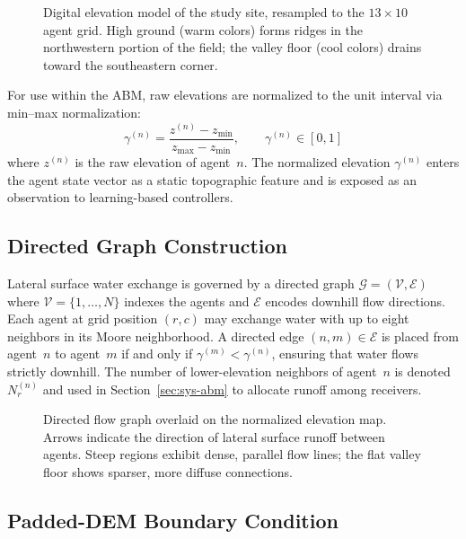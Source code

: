 \begin{figure}[h]
\centering
\caption{Digital elevation model of the study site, resampled to the
$13 \times 10$ agent grid. High ground (warm colors) forms ridges in the
northwestern portion of the field; the valley floor (cool colors) drains
toward the southeastern corner.}
\label{fig:dem-heatmap}
\end{figure}

For use within the ABM, raw elevations are normalized to the unit interval
via min--max normalization:
\begin{equation}
\gamma^{(n)} = \frac{z^{(n)} - z_{\min}}{z_{\max} - z_{\min}}, \qquad
\gamma^{(n)} \in [0,1]
\label{eq:elev-norm}
\end{equation}
where $z^{(n)}$ is the raw elevation of agent~$n$. The normalized
elevation $\gamma^{(n)}$ enters the agent state vector as a static
topographic feature and is exposed as an observation to learning-based
controllers.

\subsection{Directed Graph Construction}
\label{ssec:sys-graph}

Lateral surface water exchange is governed by a directed graph
$\mathcal{G} = (\mathcal{V}, \mathcal{E})$ where
$\mathcal{V} = \{1, \ldots, N\}$ indexes the agents and
$\mathcal{E}$ encodes downhill flow directions. Each agent at grid
position $(r, c)$ may exchange water with up to eight neighbors in its
Moore neighborhood. A directed edge $(n, m) \in \mathcal{E}$ is placed
from agent~$n$ to agent~$m$ if and only if
$\gamma^{(m)} < \gamma^{(n)}$, ensuring that water flows strictly
downhill. The number of lower-elevation neighbors of agent~$n$ is
denoted $N_r^{(n)}$ and used in Section~\ref{sec:sys-abm} to allocate
runoff among receivers.

\begin{figure}[h]
\centering
\caption{Directed flow graph overlaid on the normalized elevation map.
Arrows indicate the direction of lateral surface runoff between agents.
Steep regions exhibit dense, parallel flow lines; the flat valley floor
shows sparser, more diffuse connections.}
\label{fig:flow-graph}
\end{figure}

\subsection{Padded-DEM Boundary Condition}
\label{ssec:sys-padded-dem}

